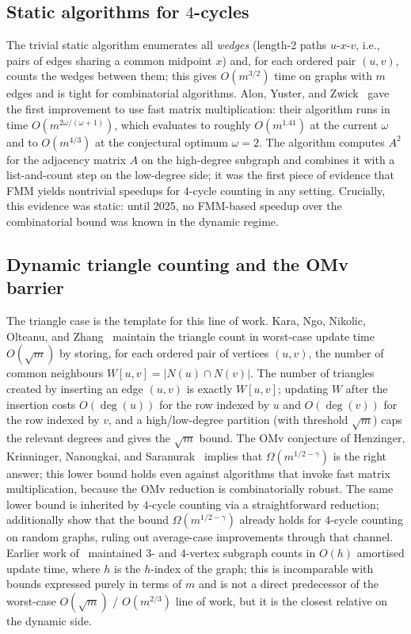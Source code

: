 \documentclass[sigconf,nonacm]{acmart}
\theoremstyle{plain}
\theoremstyle{definition}
\begin{document}
\subsection{Static algorithms for $4$-cycles}
\label{sec:related:static}
The trivial static algorithm enumerates all \emph{wedges} (length-2
paths $u$-$x$-$v$, i.e., pairs of edges sharing a common midpoint
$x$) and, for each ordered pair $(u, v)$, counts the wedges between
them; this gives $O(m^{3/2})$ time on graphs with $m$ edges and is
tight for combinatorial algorithms. Alon, Yuster, and Zwick~\cite{AYZ97} gave
the first improvement to use fast matrix multiplication: their
algorithm runs in time $O(m^{2\omega/(\omega+1)})$, which evaluates
to roughly $O(m^{1.41})$ at the current $\omega$ and to
$O(m^{4/3})$ at the conjectural optimum $\omega = 2$. The
algorithm computes $A^2$ for the adjacency matrix $A$ on the
high-degree subgraph and combines it with a list-and-count step on
the low-degree side; it was the first piece of evidence that FMM
yields nontrivial speedups for $4$-cycle counting in any setting.
Crucially, this evidence was static: until 2025, no FMM-based
speedup over the combinatorial bound was known in the dynamic
regime.

\subsection{Dynamic triangle counting and the OMv barrier}
\label{sec:related:triangles}
The triangle case is the template for this line of work. Kara,
Ngo, Nikolic, Olteanu, and Zhang~\cite{KNN20} maintain
the triangle count in worst-case update time $O(\sqrt{m})$ by
storing, for each ordered pair of vertices $(u, v)$, the number of
common neighbours $W[u, v] = |N(u) \cap N(v)|$. The number of
triangles created by inserting an edge $(u, v)$ is exactly
$W[u, v]$; updating $W$ after the insertion costs $O(\deg(u))$ for
the row indexed by $u$ and $O(\deg(v))$ for the row indexed by $v$,
and a high/low-degree partition (with threshold $\sqrt{m}$) caps
the relevant degrees and gives the $\sqrt{m}$ bound. The
OMv conjecture of Henzinger, Krinninger, Nanongkai, and
Saranurak~\cite{HKNS15} implies that $\Omega(m^{1/2-\gamma})$ is the
right answer; this lower bound holds even against algorithms that
invoke fast matrix multiplication, because the OMv reduction is
combinatorially robust. The same lower bound is inherited by
$4$-cycle counting via a straightforward reduction;
\cite{HLS22} additionally show that the bound $\Omega(m^{1/2-\gamma})$
already holds for $4$-cycle counting on random graphs, ruling out
average-case improvements through that channel. Earlier work
of~\cite{ES09,EGST12} maintained $3$- and $4$-vertex subgraph
counts in $O(h)$ amortised update time, where $h$ is the $h$-index
of the graph; this is incomparable with bounds expressed purely in
terms of $m$ and is not a direct predecessor of the worst-case
$O(\sqrt{m})$ / $O(m^{2/3})$ line of work, but it is the closest
relative on the dynamic side.
\end{document}
